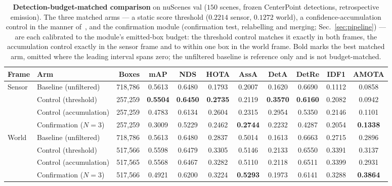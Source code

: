 \begin{table}[t]
\centering\footnotesize
\setlength{\tabcolsep}{5pt}
\begin{tabular}{llrcccccccc}
\toprule
Frame & Arm & Boxes & mAP & NDS & HOTA & AssA & DetA & DetRe & IDF1 & AMOTA \\
\midrule
\multirow{4}{*}{Sensor}
 & Baseline (unfiltered)      &   718{,}786 & 0.5613 & 0.6480 & 0.1793 & 0.2007 & 0.1620 & 0.6690 & 0.1112 & 0.0858 \\
 & Control (threshold)       &   257{,}259 & \textbf{0.5504} & \textbf{0.6450} & \textbf{0.2735} & 0.2119 & \textbf{0.3570} & \textbf{0.6160} & 0.2082 & 0.0942 \\
 & Control (accumulation)     &   257{,}259 & 0.4783 & 0.6134 & 0.2604 & 0.2315 & 0.2954 & 0.5350 & 0.2146 & 0.1101 \\
 & Confirmation ($N{=}3$)     &   257{,}259 & 0.3009 & 0.5229 & 0.2462 & \textbf{0.2744} & 0.2232 & 0.4287 & 0.2054 & \textbf{0.1338} \\
\midrule
\multirow{4}{*}{World}
 & Baseline (unfiltered)      &   718{,}786 & 0.5613 & 0.6480 & 0.2837 & 0.5014 & 0.1613 & 0.6663 & 0.2715 & 0.2896 \\
 & Control (threshold)       &   517{,}566 & 0.5598 & 0.6479 & 0.3305 & 0.5146 & 0.2133 & 0.6550 & 0.3391 & 0.3137 \\
 & Control (accumulation)     &   517{,}565 & 0.5568 & 0.6467 & 0.3282 & 0.5110 & 0.2118 & 0.6511 & 0.3399 & 0.2931 \\
 & Confirmation ($N{=}3$)     &   517{,}566 & 0.4921 & 0.6200 & 0.3224 & \textbf{0.5293} & 0.1973 & 0.6141 & 0.3288 & \textbf{0.3864} \\
\bottomrule
\end{tabular}
\caption{\textbf{Detection-budget-matched comparison} on nuScenes val
($150$ scenes, frozen CenterPoint detections, retrospective emission). The
three matched arms --- a static score threshold ($0.2214$ sensor, $0.1272$
world), a confidence-accumulation control in the manner of~\cite{cbmot}, and the
confirmation module (confirmation test, relabelling and merging;
Sec.~\ref{sec:pipeline}) --- are each calibrated to the module's emitted-box
budget: the threshold control matches it exactly in both frames, the
accumulation control exactly in the sensor frame and to within one box in the
world frame. Bold marks the best
matched arm, omitted where the leading interval spans zero; the unfiltered
baseline is reference only and is not budget-matched.}
\label{tab:detmatch}
\end{table}

